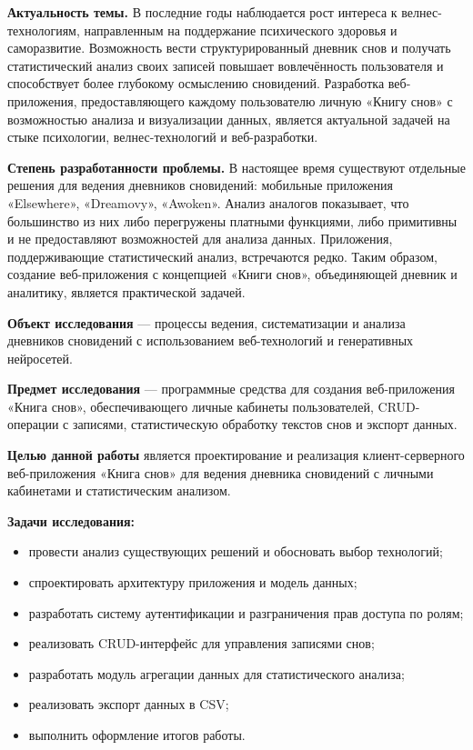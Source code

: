 \documentclass[14pt, a4paper]{extarticle}
\begin{document}
\textbf{Актуальность темы.} В последние годы наблюдается рост интереса к 
велнес-технологиям, направленным на поддержание психического здоровья и 
саморазвитие. Возможность вести структурированный дневник снов и получать 
статистический анализ своих записей повышает вовлечённость пользователя и 
способствует более глубокому осмыслению сновидений. Разработка веб-приложения, 
предоставляющего каждому пользователю личную «Книгу снов» с возможностью 
анализа и визуализации данных, является актуальной задачей на стыке психологии, велнес-технологий и веб-разработки.

\textbf{Степень разработанности проблемы.} В настоящее время существуют 
отдельные решения для ведения дневников сновидений: мобильные приложения 
«Elsewhere», «Dreamovy», «Awoken». Анализ аналогов показывает, что большинство 
из них либо перегружены платными функциями, либо примитивны и не предоставляют 
возможностей для анализа данных. Приложения, поддерживающие статистический 
анализ, встречаются редко. Таким образом, создание веб-приложения с концепцией 
«Книги снов», объединяющей дневник и аналитику, является практической задачей.

\textbf{Объект исследования} — процессы ведения, систематизации и анализа 
дневников сновидений с использованием веб-технологий и генеративных нейросетей.

\textbf{Предмет исследования} — программные средства для создания 
веб-приложения «Книга снов», обеспечивающего личные кабинеты пользователей, 
CRUD-операции с записями, статистическую обработку текстов снов и экспорт данных.

\textbf{Целью данной работы} является проектирование и реализация 
клиент-серверного веб-приложения «Книга снов» для ведения дневника сновидений 
с личными кабинетами и статистическим анализом.

\textbf{Задачи исследования:}
\begin{itemize}
    \item провести анализ существующих решений и обосновать выбор технологий;
    \item спроектировать архитектуру приложения и модель данных;
    \item разработать систему аутентификации и разграничения прав доступа 
    по ролям;
    \item реализовать CRUD-интерфейс для управления записями снов;
    \item разработать модуль агрегации данных для статистического анализа;
    \item реализовать экспорт данных в CSV;
    \item выполнить оформление итогов работы.
\end{itemize}
\end{document}
